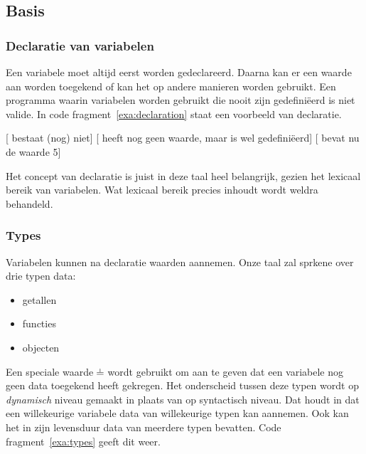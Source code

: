 \subsection{Basis}

\subsubsection{Declaratie van variabelen}

Een variabele moet altijd eerst worden gedeclareerd. Daarna kan er een waarde aan worden toegekend of kan het op andere manieren worden gebruikt. Een programma waarin variabelen worden gebruikt die nooit zijn gedefiniëerd is niet valide. In code fragment~\ref{exa:declaration} staat een voorbeeld van declaratie.

\begin{NoBreak}
\codeFragmentCaption
\begin{codelines}
  \codeLine{}[ bestaat (nog) niet]
  [ heeft nog geen waarde, maar is wel gedefiniëerd]
  [ bevat nu de waarde 5]
\end{codelines}
\end{NoBreak}

Het concept van declaratie is juist in deze taal heel belangrijk, gezien het lexicaal bereik van variabelen. Wat lexicaal bereik precies inhoudt wordt weldra behandeld.

\subsubsection{Types}
\label{subsec:taal-types}

Variabelen kunnen na declaratie waarden aannemen. Onze taal zal sprkene over drie typen data:
\begin{itemize}
  \item getallen
  \item functies
  \item objecten
\end{itemize}
Een speciale waarde $\nil$ wordt gebruikt om aan te geven dat een variabele nog geen data toegekend heeft gekregen. Het onderscheid tussen deze typen wordt op \emph{dynamisch} niveau gemaakt in plaats van op syntactisch niveau. Dat houdt in dat een willekeurige variabele data van willekeurige typen kan aannemen. Ook kan het in zijn levensduur data van meerdere typen bevatten. Code fragment~\ref{exa:types} geeft dit weer.

